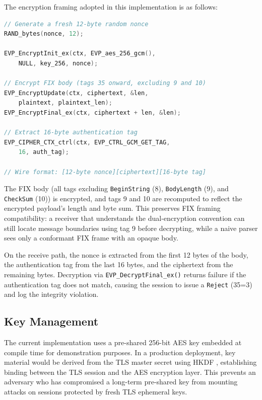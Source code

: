 \documentclass[twocolumn,10pt]{article}
\begin{document}
The encryption framing adopted in this implementation is as follows:

\begin{lstlisting}[language=C++, caption={AES-256-GCM encryption of FIX body},
  label={lst:aes}]
// Generate a fresh 12-byte random nonce
RAND_bytes(nonce, 12);

EVP_EncryptInit_ex(ctx, EVP_aes_256_gcm(),
    NULL, key_256, nonce);

// Encrypt FIX body (tags 35 onward, excluding 9 and 10)
EVP_EncryptUpdate(ctx, ciphertext, &len,
    plaintext, plaintext_len);
EVP_EncryptFinal_ex(ctx, ciphertext + len, &len);

// Extract 16-byte authentication tag
EVP_CIPHER_CTX_ctrl(ctx, EVP_CTRL_GCM_GET_TAG,
    16, auth_tag);

// Wire format: [12-byte nonce][ciphertext][16-byte tag]
\end{lstlisting}

The FIX body (all tags excluding \texttt{BeginString} (8),
\texttt{BodyLength} (9), and \texttt{CheckSum} (10)) is encrypted, and
tags 9 and 10 are recomputed to reflect the encrypted payload's length
and byte sum. This preserves FIX framing compatibility: a receiver that
understands the dual-encryption convention can still locate message
boundaries using tag 9 before decrypting, while a naive parser sees only
a conformant FIX frame with an opaque body.

On the receive path, the nonce is extracted from the first 12 bytes of the
body, the authentication tag from the last 16 bytes, and the ciphertext
from the remaining bytes. Decryption via \texttt{EVP\_DecryptFinal\_ex()}
returns failure if the authentication tag does not match, causing the
session to issue a \texttt{Reject} (35=3) and log the integrity violation.

\subsection{Key Management}

The current implementation uses a pre-shared 256-bit AES key embedded at
compile time for demonstration purposes. In a production deployment, key
material would be derived from the TLS master secret using HKDF
\cite{rfc8446}, establishing binding between the TLS session and the
AES encryption layer. This prevents an adversary who has compromised a
long-term pre-shared key from mounting attacks on sessions protected by
fresh TLS ephemeral keys.
\end{document}
